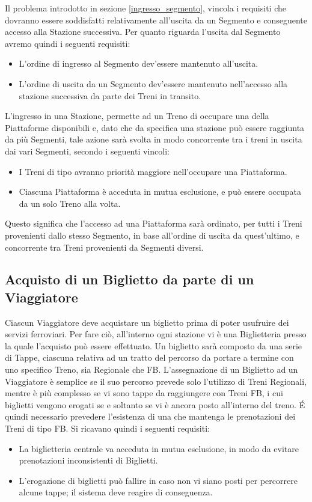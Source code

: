 	Il problema introdotto in sezione \ref{ingresso_segmento}, vincola i requisiti che dovranno essere soddisfatti relativamente all'uscita da un Segmento e conseguente accesso alla Stazione successiva. Per quanto riguarda l'uscita dal Segmento avremo quindi i seguenti requisiti:
		\begin{itemize}
			\item L'ordine di ingresso al Segmento dev'essere mantenuto all'uscita. 
			\item L'ordine di uscita da un Segmento dev'essere mantenuto nell'accesso alla stazione successiva da parte dei Treni in transito.
		\end{itemize}

	L'ingresso in una Stazione, permette ad un Treno di occupare una della Piattaforme disponibili e, dato che da specifica una stazione può essere raggiunta da più Segmenti, tale azione sarà svolta in modo concorrente tra i treni in uscita dai vari Segmenti, secondo i seguenti vincoli:
		\begin{itemize}
			\item I Treni di tipo  avranno priorità maggiore nell'occupare una Piattaforma.
			\item Ciascuna Piattaforma è acceduta in mutua esclusione, e può essere occupata da un solo Treno alla volta.  
		\end{itemize}

	Questo significa che l'accesso ad una Piattaforma sarà ordinato, per tutti i Treni provenienti dallo stesso Segmento, in base all'ordine di uscita da quest'ultimo, e concorrente tra Treni provenienti da Segmenti diversi. 

	\subsection{Acquisto di un Biglietto da parte di un Viaggiatore}

	Ciascun Viaggiatore deve acquistare un biglietto prima di poter usufruire dei servizi ferroviari. Per fare ciò, all'interno ogni stazione vi è una Biglietteria presso la quale l'acquisto può essere effettuato. Un biglietto sarà composto da una serie di Tappe, ciascuna relativa ad un tratto del percorso da portare a termine con uno specifico Treno, sia Regionale che FB. 
	L'assegnazione di un Biglietto ad un Viaggiatore è semplice se il suo percorso prevede solo l'utilizzo di Treni Regionali, mentre è più complesso se vi sono tappe da raggiungere con Treni FB, i cui biglietti vengono erogati se e soltanto se vi è ancora posto all'interno del treno.
	\'E quindi necessario prevedere l'esistenza di una  che mantenga le prenotazioni dei Treni di tipo FB. Si ricavano quindi i seguenti requisiti:
		\begin{itemize}
			\item La biglietteria centrale va acceduta in mutua esclusione, in modo da evitare prenotazioni inconsistenti di Biglietti.
			\item L'erogazione di biglietti può fallire in caso non vi siano posti per percorrere alcune tappe; il sistema deve reagire di conseguenza.
		\end{itemize}

